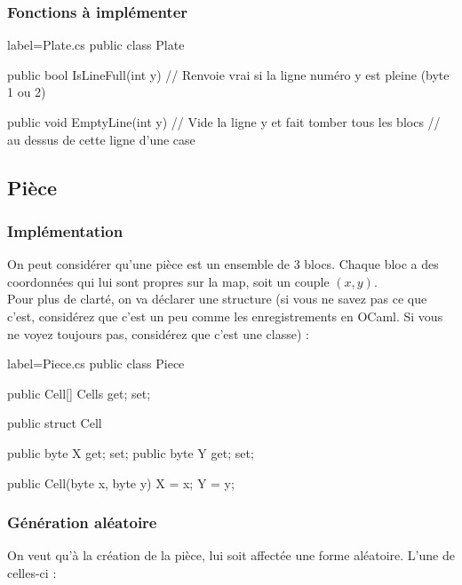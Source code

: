 \documentclass[a4paper]{article}
\begin{document}
\subsubsection{Fonctions à implémenter}

\begin{csharpcode*}{label=Plate.cs}
public class Plate
{
    public bool IsLineFull(int y)
    {
        // Renvoie vrai si la ligne numéro y est pleine (byte 1 ou 2)
    }
    
    public void EmptyLine(int y)
    {
        // Vide la ligne y et fait tomber tous les blocs
        // au dessus de cette ligne d'une case
    }
}
\end{csharpcode*}

\subsection{Pièce}

\subsubsection{Implémentation}

On peut considérer qu'une pièce est un ensemble de 3 blocs. Chaque bloc a des
coordonnées qui lui sont propres sur la map, soit un couple $(x,y)$. \\

Pour plus de clarté, on va déclarer une structure (si vous ne savez pas ce que
c'est, considérez que c'est un peu comme les enregistrements en OCaml. Si vous
ne voyez toujours pas, considérez que c'est une classe) : \\

\begin{csharpcode*}{label=Piece.cs}
public class Piece
{
    public Cell[] Cells { get; set; }

    public struct Cell
    {
        public byte X { get; set; }
        public byte Y { get; set; }

        public Cell(byte x, byte y)
        {
            X = x;
            Y = y;
        }
    }
}
\end{csharpcode*}

\subsubsection{Génération aléatoire}
\begingroup
    On veut qu'à la création de la pièce, lui soit affectée une forme aléatoire.
    L'une de celles-ci : \\
\end{document}
